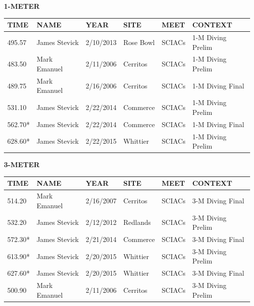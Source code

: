 \begin{table}[H]
\centering
\begin{minipage}[t]{0.6\textwidth}
\centering
\textbf{1-METER}\\[0.1cm]
\begin{tabular}{@{}p{1.8cm}p{2.8cm}p{1.2cm}p{1.4cm}p{1.4cm}p{2.0cm}@{}}
\hline
    \textbf{TIME} & \textbf{NAME} & \textbf{YEAR} & \textbf{SITE} & \textbf{MEET} & \textbf{CONTEXT} \\
\hline
    495.57 & James Stevick & 2/10/2013 & Rose Bowl & SCIACs & 1-M Diving Prelim \\
    483.50 & Mark Emanuel & 2/11/2006 & Cerritos & SCIACs & 1-M Diving Prelim \\
    489.75 & Mark Emanuel & 2/16/2006 & Cerritos & SCIACs & 1-M Diving Final \\
    531.10 & James Stevick & 2/22/2014 & Commerce & SCIACs & 1-M Diving Prelim \\
    562.70* & James Stevick & 2/22/2014 & Commerce & SCIACs & 1-M Diving Final \\
    628.60* & James Stevick & 2/22/2015 & Whittier & SCIACs & 1-M Diving Prelim \\
\hline
\end{tabular}
\end{minipage}
\end{table}

\begin{table}[H]
\centering
\begin{minipage}[t]{0.6\textwidth}
\centering
\textbf{3-METER}\\[0.1cm]
\begin{tabular}{@{}p{1.8cm}p{2.8cm}p{1.2cm}p{1.4cm}p{1.4cm}p{2.0cm}@{}}
\hline
    \textbf{TIME} & \textbf{NAME} & \textbf{YEAR} & \textbf{SITE} & \textbf{MEET} & \textbf{CONTEXT} \\
\hline
    514.20 & Mark Emanuel & 2/16/2007 & Cerritos & SCIACs & 3-M Diving Final \\
    532.20 & James Stevick & 2/12/2012 & Redlands & SCIACs & 3-M Diving Prelim \\
    572.30* & James Stevick & 2/21/2014 & Commerce & SCIACs & 3-M Diving Final \\
    613.90* & James Stevick & 2/20/2015 & Whittier & SCIACs & 3-M Diving Prelim \\
    627.60* & James Stevick & 2/20/2015 & Whittier & SCIACs & 3-M Diving Final \\
    500.90 & Mark Emanuel & 2/11/2006 & Cerritos & SCIACs & 3-M Diving Prelim \\
\hline
\end{tabular}
\end{minipage}
\end{table}

